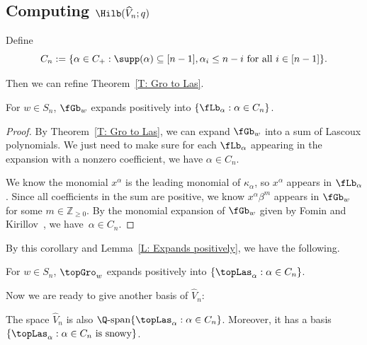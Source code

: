 \subsection{Computing \texorpdfstring{$\Hilb(\widehat{V}_n; q)$}{TEXT}}
\label{subsec.hilbert.vn}

Define 
$$C_n := \{ \alpha \in C_+: \supp(\alpha) \subseteq [n - 1], \alpha_i \leq n - i \textrm{ for all $i \in [n - 1]$}\}.$$

Then we can refine 
Theorem~\ref{T: Gro to Las}.
\begin{cor}
\label{C: Gro to Las for n}
For $w \in S_n$, 
$\fGb_w$ expands positively into $\{\fLb_\alpha: \alpha \in C_n\}$.
\end{cor}
\begin{proof}
By Theorem~\ref{T: Gro to Las},
we can expand $\fGb_w$ into a sum of Lascoux polynomials.
We just need to make sure for each $\fLb_{\alpha}$ appearing
in the expansion with a nonzero coefficient,
we have $\alpha \in C_n$.

We know the monomial $x^\alpha$ is the leading monomial of 
$\kappa_\alpha$, so $x^\alpha$ appears in $\fLb_\alpha$.
Since all coefficients in the sum are positive,
we know $x^\alpha \beta^m$ appears in $\fGb_w$ for
some $m \in \mathbb{Z}_{\geq 0}$.
By the monomial expansion of $\fGb_w$ 
given by Fomin and Kirillov~\cite{FK},
we have~$\alpha \in C_n$.
\end{proof}

By this corollary and Lemma~\ref{L: Expands positively},
we have the following. 
\begin{cor}
\label{C: Top Gro to Top Las for n}
For $w \in S_n$, 
$\topGro_w$ expands positively 
into $\{\topLas_\alpha: \alpha \in C_n\}$.
\end{cor}

Now we are ready to give another basis of $\widehat{V}_n$:
\begin{prop}
\label{P: Top Las basis}
The space $\widehat{V}_n$ is also $\Q\textrm{-span}\{\topLas_\alpha: \alpha \in C_n\}$. 
Moreover, it has a basis 
$\{ \topLas_\alpha: \alpha \in C_n \textrm{ is snowy}\}$.
\end{prop}

